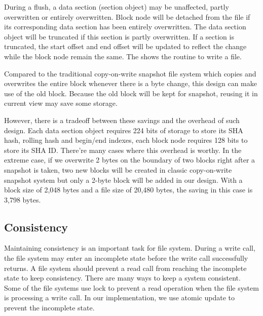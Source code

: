     During a flush, a data section (section object) may be unaffected, partly overwritten or entirely overwritten. Block node will be detached from the file if its corresponding data section has been entirely overwritten. The data section object will be truncated if this section is partly overwritten. If a section is truncated, the start offset and end offset will be updated to reflect the change while the block node remain the same. The  shows the routine to write a file.

    Compared to the traditional copy-on-write snapshot file system which copies and overwrites the entire block whenever there is a byte change, this design can make use of the old block. Because the old block will be kept for snapshot, reusing it in current view may save some storage.

    However, there is a tradeoff between these savings and the overhead of such design. Each data section object requires 224 bits of storage to store its SHA hash, rolling hash and begin/end indexes, each block node requires 128 bits to store its SHA ID. There're many cases where this overhead is worthy. In the extreme case, if we overwrite 2 bytes on the boundary of two blocks right after a snapshot is taken, two new blocks will be created in classic copy-on-write snapshot system but only a 2-byte block will be added in our design. With a block size of 2,048 bytes and a file size of 20,480 bytes, the saving in this case is 3,798 bytes.

\subsection{Consistency}

    Maintaining consistency is an important task for file system. During a write call, the file system may enter an incomplete state before the write call successfully returns. A file system should prevent a read call from reaching the incomplete state to keep consistency. There are many ways to keep a system consistent. Some of the file systems use lock to prevent a read operation when the file system is processing a write call. In our implementation, we use atomic update to prevent the incomplete state.

